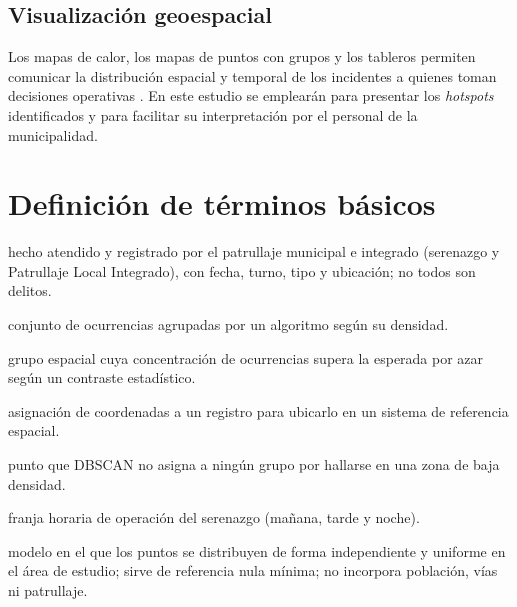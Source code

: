 \subsection{Visualización geoespacial}

Los mapas de calor, los mapas de puntos con grupos y los tableros permiten comunicar la distribución espacial y temporal de los incidentes a quienes toman decisiones operativas \citep{ristea2020crimegis,medinaariza2023hotspots}. En este estudio se emplearán para presentar los \textit{hotspots} identificados y para facilitar su interpretación por el personal de la municipalidad.

\section{Definición de términos básicos}

\begin{description}[leftmargin=0pt,labelindent=0pt,font=\bfseries]
\item[\termref{term-incident}{Ocurrencia de seguridad ciudadana}:] hecho atendido y registrado por el patrullaje municipal e integrado (serenazgo y Patrullaje Local Integrado), con fecha, turno, tipo y ubicación; no todos son delitos.
\item[\termref{term-spatial-cluster}{Grupo espacial (clúster)}:] conjunto de ocurrencias agrupadas por un algoritmo según su densidad.
\item[\termref{term-hotspot}{Hotspot}:] grupo espacial cuya concentración de ocurrencias supera la esperada por azar según un contraste estadístico.
\item[\termref{term-georeferencing}{Georreferenciación}:] asignación de coordenadas a un registro para ubicarlo en un sistema de referencia espacial.
\item[\termref{term-noise}{Ruido}:] punto que DBSCAN no asigna a ningún grupo por hallarse en una zona de baja densidad.
\item[\termref{term-shift}{Turno}:] franja horaria de operación del serenazgo (mañana, tarde y noche).
\item[Aleatoriedad espacial completa (\gls{csr}):] modelo en el que los puntos se distribuyen de forma independiente y uniforme en el área de estudio; sirve de referencia nula mínima; no incorpora población, vías ni patrullaje.
\end{description}
